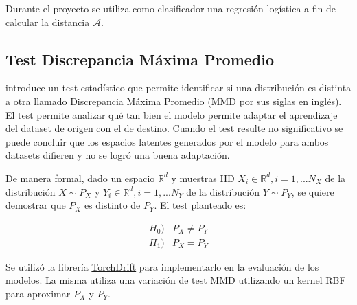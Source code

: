Durante el proyecto se utiliza como clasificador una regresi\'on log\'istica a fin de calcular la distancia
$\mathcal{A}$.

\subsection{Test Discrepancia M\'axima Promedio}

\cite{gretton2012kernel} introduce un test estad\'istico que permite identificar si una distribuci\'on es distinta a
otra llamado Discrepancia M\'axima Promedio (MMD por sus siglas en ingl\'es). El test permite analizar qu\'e tan
bien el modelo permite adaptar el aprendizaje del dataset de origen con el de destino. Cuando el test resulte no
significativo se puede concluir que los espacios latentes generados por el modelo para ambos datasets difieren y no se
logr\'o una buena adaptaci\'on.

De manera formal, dado un espacio $\mathbb{R}^d$ y muestras IID $X_i \in \mathbb{R}^d, i=1,...N_X$ de la distribuci\'on
$X \sim P_X$ y $Y_i \in \mathbb{R}^d, i=1,...N_Y$ de la distribuci\'on $Y \sim P_Y$, se quiere demostrar que $P_X$ es
distinto de $P_Y$. El test planteado es:

\begin{align}
    H_0) & P_X \neq P_Y \nonumber \\
    H_1) & P_X = P_Y
\end{align}

Se utiliz\'o la librer\'ia \href{https://github.com/torchdrift/torchdrift/}{TorchDrift} para implementarlo en la
evaluaci\'on de los modelos. La misma utiliza una variaci\'on de test MMD utilizando un kernel RBF para aproximar $P_X$
y $P_Y$.

